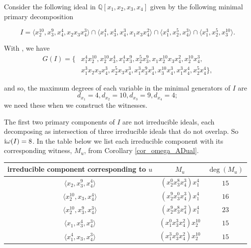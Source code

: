 \documentclass[11pt]{amsart}   %
\begin{document}
\begin{exm}\label{exm_v_number} Consider the following ideal in $\mathbb Q[x_1,x_2,x_3,x_4]$ given by the following minimal primary decomposition

$$I=\langle x_2^{10},x_3^9,x_4^4,x_2x_3x_4^3\rangle\cap\langle x_1^4,x_3^4,x_4^3,x_1x_3x_4^2\rangle \cap\langle x_1^4, x_2^5,x_4^3\rangle\cap\langle x_1^3, x_2^5,x_3^{10}\rangle.$$

With \cite{GrSt}, we have
\begin{align*}
G(I)=\{& x_1^4x_2^{10},x_2^{10}x_3^4,x_1^4x_3^9,x_2^5x_3^9,x_1x_2^{10}x_3x_4^2,x_2^{10}x_4^3,\\
& x_1^3x_2x_3x_4^3,x_2^5x_3x_4^3,x_1^3x_3^9x_4^3,x_3^{10}x_4^3,x_1^3x_4^4,x_2^5x_4^4\},
\end{align*}
   
and so, the maximum degrees of each variable in the minimal generators of $I$ are $$d_{x_1}=4, d_{x_2}=10, d_{x_3}=9,d_{x_4}=4;$$ we need these when we construct the witnesses.

The first two primary components of $I$ are not irreducible ideals, each decomposing as intersection of three irreducible ideals that do not overlap. So ${\rm i}\omega(I)=8$. In the table below we list each irreducible component with its corresponding witness, $M_u$, from Corollary \ref{cor_omega_ADual}.

\medskip

\begin{center}
\begin{tabular}{c|c|c}

irreducible component corresponding to $u$ & $M_u$ & $\deg(M_u)$\\
\hline

$\langle x_2,x_3^9,x_4^4\rangle$ & $(x_2^0x_3^8x_4^3)x_1^4$ & $15$ \\


\hline

$\langle x_2^{10},x_3,x_4^4\rangle$ & $(x_2^9x_3^0x_4^3)x_1^4$ & $16$\\

\hline

$\langle x_2^{10},x_3^9,x_4^3\rangle$ & $(x_2^9x_3^8x_4^2)x_1^4$ & $23$\\

\hline

$\langle x_1,x_3^4,x_4^3\rangle$ & $(x_1^0x_3^3x_4^2)x_2^{10}$ & $15$\\

\hline

$\langle x_1^4,x_3,x_4^3\rangle$ & $(x_1^3x_3^0x_4^2)x_2^{10}$ & $15$\\


\end{tabular}
\end{center}
\end{exm}
\end{document}
